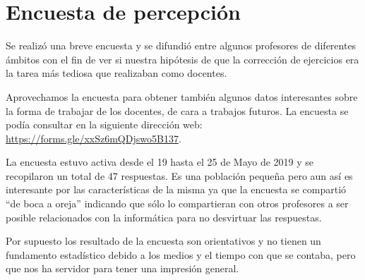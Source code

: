 \section{Encuesta de percepción}

Se realizó una breve encuesta y se difundió entre algunos profesores de diferentes ámbitos con el fin de ver si nuestra hipótesis de que la corrección de ejercicios era la tarea más tediosa que realizaban como docentes.

\bigskip
Aprovechamos la encuesta para obtener también algunos datos interesantes sobre la forma de trabajar de los docentes, de cara a trabajos futuros. La encuesta se podía consultar en la siguiente dirección web: \url{https://forms.gle/xxSz6mQDjswo5B137}.

\bigskip
La encuesta estuvo activa desde el 19 hasta el 25 de Mayo de 2019 y se recopilaron un total de 47 respuestas. Es una población pequeña pero aun así es interesante por las características de la misma ya que la encuesta se compartió ``de boca a oreja'' indicando que sólo lo compartieran con otros profesores a ser posible relacionados con la informática para no desvirtuar las respuestas.

\bigskip
Por supuesto los resultado de la encuesta son orientativos y no tienen un fundamento estadístico debido a los medios y el tiempo con que se contaba, pero que nos ha servidor para tener una impresión general.

